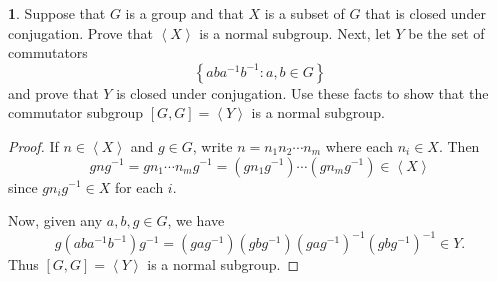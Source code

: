 \documentclass[12pt]{article}
\theoremstyle{definition}
\newtheorem{ex}{}
\begin{document}
\begin{ex}
	Suppose that $G$ is a group and that $X$ is a subset of $G$ that is closed under conjugation.
	Prove that $\left\langle X \right\rangle$ is a normal subgroup.
	Next, let $Y$ be the set of commutators \begin{equation*}
		\left\lbrace aba^{-1}b^{-1} : a, b \in G \right\rbrace
	\end{equation*}
	and prove that $Y$ is closed under conjugation.
	Use these facts to show that the commutator subgroup $[G,G] = \left\langle Y \right\rangle$ is a normal subgroup.
\end{ex}
\begin{proof}
	If $n \in \left\langle X \right\rangle$ and $g \in G$, write $n=n_1n_2 \cdots n_m$ where each $n_i \in X$.
	Then \begin{equation*}
		gng^{-1} = gn_1\cdots n_m g^{-1} = (gn_1g^{-1})\cdots(gn_mg^{-1}) \in \left\langle X \right\rangle
	\end{equation*}
  since $gn_ig^{-1} \in X$ for each $i$.

  Now, given any $a, b, g \in G$, we have \begin{equation*}
    g(aba^{-1}b^{-1})g^{-1} = (gag^{-1})(gbg^{-1})(gag^{-1})^{-1}(gbg^{-1})^{-1} \in Y.
  \end{equation*}
  Thus $[G,G] = \left\langle Y \right\rangle$ is a normal subgroup.
\end{proof}
\end{document}
